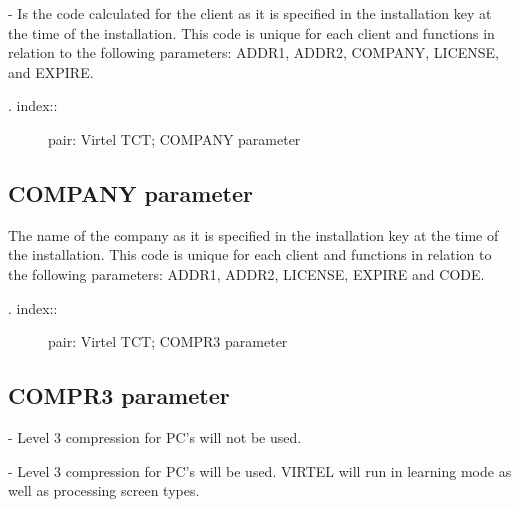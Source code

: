 \documentclass[letterpaper,10pt,english]{sphinxmanual}
\begin{document}
 - Is the code calculated for the client as it is specified in the installation key at the time of the installation. This code
is unique for each client and functions in relation to the following parameters: ADDR1, ADDR2, COMPANY, LICENSE, and EXPIRE.
\begin{description}
\item[{. index::}] \leavevmode
pair: Virtel TCT; COMPANY parameter

\end{description}


\subsection{COMPANY parameter}
\label{\detokenize{Installation_Guide:company-parameter}}
\begin{sphinxVerbatim}[commandchars=\\\{\}]
 
\end{sphinxVerbatim}

The name of the company as it is specified in the installation key at the time of the installation. This code is unique for
each client and functions in relation to the following parameters: ADDR1, ADDR2, LICENSE, EXPIRE and CODE.
\begin{description}
\item[{. index::}] \leavevmode
pair: Virtel TCT; COMPR3 parameter

\end{description}


\subsection{COMPR3 parameter}
\label{\detokenize{Installation_Guide:compr3-parameter}}
\begin{sphinxVerbatim}[commandchars=\\\{\}]
 
\end{sphinxVerbatim}

 - Level 3 compression for PC’s will not be used.

 - Level 3 compression for PC’s will be used. VIRTEL will run in learning mode as well as processing screen types.
\end{document}
